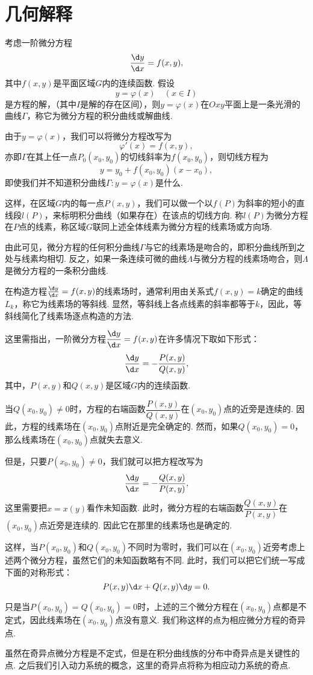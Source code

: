 \section{几何解释}
考虑一阶微分方程
$$\frac{\d y}{\d x}=f(x,y),$$
其中$f(x,y)$是平面区域$G$内的连续函数. 假设
$$y=\varphi(x)\quad(x\in I)$$
是方程的解，（其中$I$是解的存在区间），则$y=\varphi(x)$在$Oxy$平面上是一条光滑的曲线$\varGamma$，称它为微分方程的{\heiti 积分曲线}或{\heiti 解曲线}.

由于$y=\varphi(x)$，我们可以将微分方程改写为
$$\varphi'(x)=f(x,y),$$
亦即$\varGamma$在其上任一点$P_0(x_0,y_0)$的切线斜率为$f(x_0,y_0)$，则切线方程为
$$y=y_0+f(x_0,y_0)(x-x_0),$$
即使我们并不知道积分曲线$\varGamma:y=\varphi(x)$是什么.

这样，在区域$G$内的每一点$P(x,y)$，我们可以做一个以$f(P)$为斜率的短小的直线段$l(P)$，来标明积分曲线（如果存在）在该点的切线方向. 称$l(P)$为微分方程在$P$点的{\heiti 线素}，称区域$G$联同上述全体线素为微分方程的{\heiti 线素场}或{\heiti 方向场}.

由此可见，微分方程的任何积分曲线$\varGamma$与它的线素场是吻合的，即积分曲线所到之处与线素均相切. 反之，如果一条连续可微的曲线$\Lambda$与微分方程的线素场吻合，则$\Lambda$是微分方程的一条积分曲线.

\hspace*{\fill}

在构造方程$\frac{\d y}{\d x}=f(x,y)$的线素场时，通常利用由关系式$f(x,y)=k$确定的曲线$L_k$，称它为线素场的{\heiti 等斜线}. 显然，等斜线上各点线素的斜率都等于$k$，因此，等斜线简化了线素场逐点构造的方法.

\hspace*{\fill}

这里需指出，一阶微分方程$\dfrac{\d y}{\d x}=f(x,y)$在许多情况下取如下形式：
$$\frac{\d y}{\d x}=-\frac{P(x,y)}{Q(x,y)},$$
其中，$P(x,y)$和$Q(x,y)$是区域$G$内的连续函数.

当$Q(x_0,y_0)\neq 0$时，方程的右端函数$\dfrac{P(x,y)}{Q(x,y)}$在$(x_0,y_0)$点的近旁是连续的. 因此，方程的线素场在$(x_0,y_0)$点附近是完全确定的. 然而，如果$Q(x_0,y_0)=0$，那么线素场在$(x_0,y_0)$点就失去意义.

但是，只要$P(x_0,y_0)\neq 0$，我们就可以把方程改写为
$$\frac{\d y}{\d x}=-\frac{Q(x,y)}{P(x,y)},$$
这里需要把$x=x(y)$看作未知函数. 此时，微分方程的右端函数$\dfrac{Q(x,y)}{P(x,y)}$在$(x_0,y_0)$点近旁是连续的. 因此它在那里的线素场也是确定的.

这样，当$P(x_0,y_0)$和$Q(x_0,y_0)$不同时为零时，我们可以在$(x_0,y_0)$近旁考虑上述两个微分方程，虽然它们的未知函数略有不同. 此时，我们可以把它们统一写成下面的对称形式：
$$P(x,y)\d x+Q(x,y)\d y=0.$$

只是当$P(x_0,y_0)=Q(x_0,y_0)=0$时，上述的三个微分方程在$(x_0,y_0)$点都是不定式，因此线素场在$(x_0,y_0)$点没有意义. 我们称这样的点为相应微分方程的{\heiti 奇异点}.

虽然在奇异点微分方程是不定式，但是在积分曲线族的分布中奇异点是关键性的点. 之后我们引入动力系统的概念，这里的奇异点将称为相应动力系统的奇点.